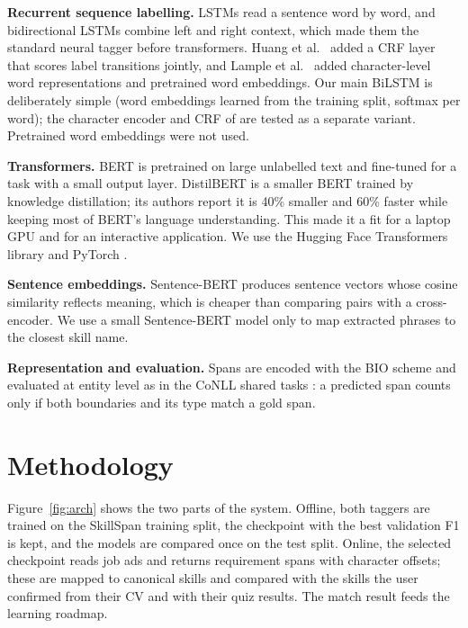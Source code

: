 \documentclass[runningheads]{llncs}
\begin{document}
\textbf{Recurrent sequence labelling.} LSTMs \cite{hochreiter1997lstm} read a sentence word by word, and
bidirectional LSTMs \cite{graves2005bilstm} combine left and right context, which made them the standard
neural tagger before transformers. Huang et al.\ \cite{huang2015bilstmcrf} added a CRF layer that scores
label transitions jointly, and Lample et al.\ \cite{lample2016ner} added character-level word
representations and pretrained word embeddings. Our main BiLSTM is deliberately simple (word embeddings
learned from the training split, softmax per word); the character encoder and CRF of
\cite{lample2016ner} are tested as a separate variant. Pretrained word embeddings were not used.

\textbf{Transformers.} BERT \cite{devlin2019bert} is pretrained on large unlabelled text and fine-tuned
for a task with a small output layer. DistilBERT \cite{sanh2019distilbert} is a smaller BERT trained by
knowledge distillation; its authors report it is 40\% smaller and 60\% faster while keeping most of
BERT's language understanding. This made it a fit for a laptop GPU and for an interactive application.
We use the Hugging Face Transformers library \cite{wolf2020transformers} and PyTorch
\cite{paszke2019pytorch}.

\textbf{Sentence embeddings.} Sentence-BERT \cite{reimers2019sbert} produces sentence vectors whose
cosine similarity reflects meaning, which is cheaper than comparing pairs with a cross-encoder. We use a
small Sentence-BERT model only to map extracted phrases to the closest skill name.

\textbf{Representation and evaluation.} Spans are encoded with the BIO scheme \cite{ramshaw1995chunking}
and evaluated at entity level as in the CoNLL shared tasks \cite{tjongkimsang2003conll}: a predicted span
counts only if both boundaries and its type match a gold span.

\section{Methodology}\label{sec:method}
Figure~\ref{fig:arch} shows the two parts of the system. Offline, both taggers are trained on the
SkillSpan training split, the checkpoint with the best validation F1 is kept, and the models are
compared once on the test split. Online, the selected checkpoint reads job ads and returns requirement
spans with character offsets; these are mapped to canonical skills and compared with the skills the
user confirmed from their CV and with their quiz results. The match result feeds the learning roadmap.
\end{document}
